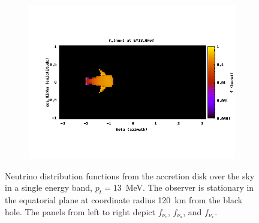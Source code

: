 \begin{figure}
\begin{subfigure}{.3\textwidth}
  \end{subfigure}
  \begin{subfigure}{.3\textwidth}
    \centering
    \includegraphics[width=1\linewidth]{Figures/f_nux-E-13MeV}
  \end{subfigure}
  \caption[$f_\nu$ for the disk, from the equatorial plane: sky map at average energy]{
    Neutrino distribution functions from the accretion disk over the sky in a
    single energy band, $p_t=13$~MeV. The observer is stationary in the
    equatorial plane at coordinate radius 120~km from the black hole.
    The panels from left to right depict $f_{\nu_e}$, $f_{\nu_a}$,
    and $f_{\nu_x}$.
  }
  \label{fig:f_disk_eq_13MeV}
\end{figure}

